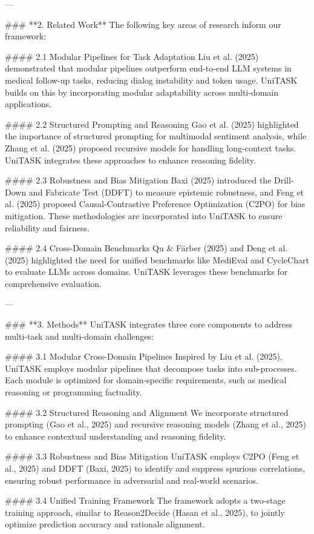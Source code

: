 ---

### **2. Related Work**
The following key areas of research inform our framework:

#### 2.1 Modular Pipelines for Task Adaptation
Liu et al. (2025) demonstrated that modular pipelines outperform end-to-end LLM systems in medical follow-up tasks, reducing dialog instability and token usage. UniTASK builds on this by incorporating modular adaptability across multi-domain applications.

#### 2.2 Structured Prompting and Reasoning
Gao et al. (2025) highlighted the importance of structured prompting for multimodal sentiment analysis, while Zhang et al. (2025) proposed recursive models for handling long-context tasks. UniTASK integrates these approaches to enhance reasoning fidelity.

#### 2.3 Robustness and Bias Mitigation
Baxi (2025) introduced the Drill-Down and Fabricate Test (DDFT) to measure epistemic robustness, and Feng et al. (2025) proposed Causal-Contrastive Preference Optimization (C2PO) for bias mitigation. These methodologies are incorporated into UniTASK to ensure reliability and fairness.

#### 2.4 Cross-Domain Benchmarks
Qu & Färber (2025) and Deng et al. (2025) highlighted the need for unified benchmarks like MediEval and CycleChart to evaluate LLMs across domains. UniTASK leverages these benchmarks for comprehensive evaluation.

---

### **3. Methods**
UniTASK integrates three core components to address multi-task and multi-domain challenges:

#### 3.1 Modular Cross-Domain Pipelines
Inspired by Liu et al. (2025), UniTASK employs modular pipelines that decompose tasks into sub-processes. Each module is optimized for domain-specific requirements, such as medical reasoning or programming factuality.

#### 3.2 Structured Reasoning and Alignment
We incorporate structured prompting (Gao et al., 2025) and recursive reasoning models (Zhang et al., 2025) to enhance contextual understanding and reasoning fidelity.

#### 3.3 Robustness and Bias Mitigation
UniTASK employs C2PO (Feng et al., 2025) and DDFT (Baxi, 2025) to identify and suppress spurious correlations, ensuring robust performance in adversarial and real-world scenarios.

#### 3.4 Unified Training Framework
The framework adopts a two-stage training approach, similar to Reason2Decide (Hasan et al., 2025), to jointly optimize prediction accuracy and rationale alignment.

